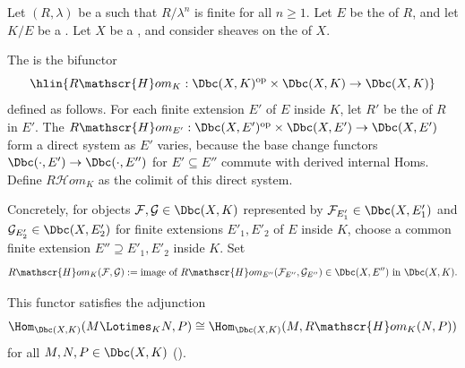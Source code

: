 \begin{definition} \label{definition:derived_internal_hom_on_bdd_constructible_complexes_with_algebraic_coefficients_on_a_noetherian_scheme}
    Let $(R, \lambda)$ be a   such that $R/\lambda^n$ is finite for all $n \geq 1$. Let $E$ be the  of $R$, and let $K/E$ be a . Let $X$ be a , and consider sheaves on the  of $X$.

    The  is the bifunctor
    $$\hlin{R\mathscr{H}om_K : \Dbc(X, K)^{\mathrm{op}} \times \Dbc(X, K) \to \Dbc(X, K)}$$
    defined as follows. For each finite extension $E'$ of $E$ inside $K$, let $R'$ be the  of $R$ in $E'$. The  $R\mathscr{H}om_{E'}: \Dbc(X, E')^{\mathrm{op}} \times \Dbc(X, E') \to \Dbc(X, E')$ form a direct system as $E'$ varies, because the base change functors $\Dbc(\cdot, E') \to \Dbc(\cdot, E'')$ for $E' \subseteq E''$ commute with derived internal Homs. Define $R\mathscr{H}om_K$ as the colimit of this direct system.

    Concretely, for objects $\mathcal{F}, \mathcal{G} \in \Dbc(X, K)$ represented by $\mathcal{F}_{E'_1} \in \Dbc(X, E'_1)$ and $\mathcal{G}_{E'_2} \in \Dbc(X, E'_2)$ for finite extensions $E'_1, E'_2$ of $E$ inside $K$, choose a common finite extension $E'' \supseteq E'_1, E'_2$ inside $K$. Set
    $$R\mathscr{H}om_K(\mathcal{F}, \mathcal{G}) := \text{image of } R\mathscr{H}om_{E''}(\mathcal{F}_{E''}, \mathcal{G}_{E''}) \in \Dbc(X, E'') \text{ in } \Dbc(X, K).$$

    This functor satisfies the adjunction
    $$\Hom_{\Dbc(X,K)}(M \Lotimes_K N, P) \cong \Hom_{\Dbc(X,K)}(M, R\mathscr{H}om_K(N,P))$$
    for all $M,N,P \in \Dbc(X, K)$ ().
\end{definition}
